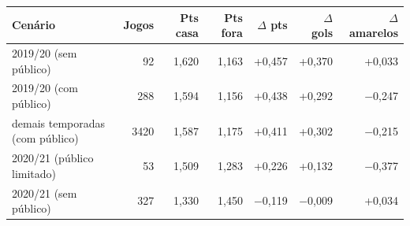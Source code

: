 \begin{tabular}{lrrrrrr}
  \toprule
  Cenário & Jogos & Pts casa & Pts fora & $\Delta$ pts & $\Delta$ gols & $\Delta$ amarelos \\
  \midrule
  2019/20 (sem público) & 92 & 1,620 & 1,163 & +0,457 & +0,370 & +0,033 \\
  2019/20 (com público) & 288 & 1,594 & 1,156 & +0,438 & +0,292 & $-$0,247 \\
  demais temporadas (com público) & 3420 & 1,587 & 1,175 & +0,411 & +0,302 & $-$0,215 \\
  2020/21 (público limitado) & 53 & 1,509 & 1,283 & +0,226 & +0,132 & $-$0,377 \\
  2020/21 (sem público) & 327 & 1,330 & 1,450 & $-$0,119 & $-$0,009 & +0,034 \\
  \bottomrule
\end{tabular}
